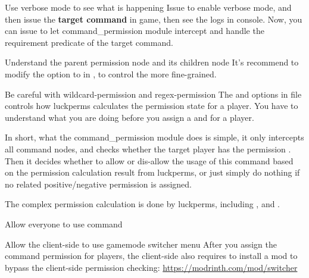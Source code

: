\begin{tips}{Use verbose mode to see what is happening}
    Issue  to enable verbose mode, and then issue the \textbf{target command} in game, then see the logs in console.
    Now, you can issue  to let command\_permission module intercept and handle the requirement predicate of the target command.
\end{tips}

\begin{warn}{Understand the parent permission node and its children node}
    It's recommend to modify the  option to  in , to control the  more fine-grained.
\end{warn}

\begin{warn}{Be careful with wildcard-permission and regex-permission}
    The  and  options in  file controls how luckperms calculates the permission state for a player.
    You have to understand what you are doing before you assign a  and  for a player.
\end{warn}

In short, what the command\_permission module does is simple, it only intercepts all command nodes, and checks whether the target player has the permission .
Then it decides whether to allow or dis-allow the usage of this command based on the permission calculation result from luckperms, or just simply do nothing if no related positive/negative permission is assigned.

The complex permission calculation is done by luckperms, including ,  and .

\begin{example}{Allow everyone to use  command}

    \begin{tips}{Allow the client-side to use gamemode switcher menu}
        After you assign the  command permission for players, the client-side also requires to install a mod to bypass the client-side permission checking: \url{https://modrinth.com/mod/switcher}
    \end{tips}
\end{example}


